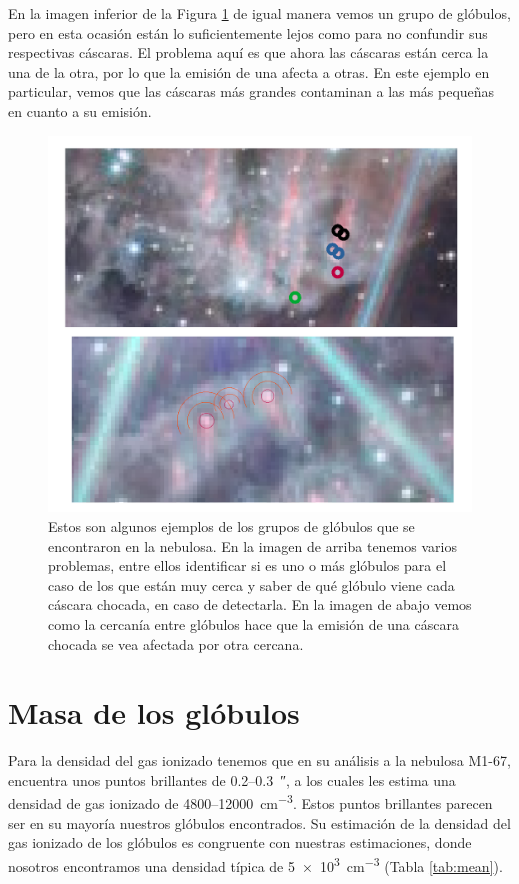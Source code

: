 \documentclass{book}
\begin{document}
En la imagen inferior de la Figura \ref{globule_group} de igual manera
vemos un grupo de glóbulos, pero en esta ocasión están lo
suficientemente lejos como para no confundir sus respectivas cáscaras.
El problema aquí es que ahora las cáscaras están cerca la una de la
otra, por lo que la emisión de una afecta a otras. En este ejemplo en
particular, vemos que las cáscaras más grandes contaminan a las más
pequeñas en cuanto a su emisión.

\begin{figure}[htb]
    \centering
    \includegraphics[width=\textwidth]{imagenes_corregidas/n_gruops_globules.pdf}
    \caption{Estos son algunos ejemplos de los grupos de glóbulos que
      se encontraron en la nebulosa. En la imagen de arriba tenemos
      varios problemas, entre ellos identificar si es uno o más
      glóbulos para el caso de los que están muy cerca y saber de qué
      glóbulo viene cada cáscara chocada, en caso de detectarla. En la
      imagen de abajo vemos como la cercanía entre glóbulos hace que
      la emisión de una cáscara chocada se vea afectada por otra
      cercana.}
    \label{globule_group}
\end{figure}

\section{Masa de los glóbulos}\label{app:masa_glo}

Para la densidad del gas ionizado tenemos que \cite{Grosdidier:1998}
en su análisis a la nebulosa M1-67, encuentra unos puntos brillantes
de 0.2--\SI{0.3}{\arcsecond}, a los cuales les estima una densidad de
gas ionizado de 4800--\SI{12 000}{cm^{-3}}. Estos puntos brillantes
parecen ser en su mayoría nuestros glóbulos encontrados. Su estimación
de la densidad del gas ionizado de los glóbulos es congruente con
nuestras estimaciones, donde nosotros encontramos una densidad típica
de \SI{5e3}{cm^{-3}} (Tabla \ref{tab:mean}).
\end{document}
